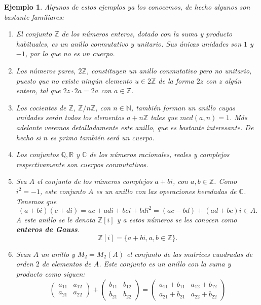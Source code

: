 \documentclass[12pt]{article}
\newtheorem{example}{Ejemplo}[theorem]
\begin{document}
\begin{example}\label{eq:ejemploAnillos} Algunos de estos ejemplos ya los conocemos, de hecho algunos son bastante familiares: \begin{enumerate}
\item El conjunto $\mathbb{Z}$ de los números enteros, dotado con la suma y producto habituales, es un anillo conmutativo y unitario. Sus únicas unidades son $1$ y $-1$, por lo que no es un cuerpo.
\item Los números pares, $2\mathbb{Z}$, constituyen un anillo conmutativo pero no unitario, puesto que no existe ningún elemento $u \in 2\mathbb{Z}$ de la forma $2z$ con $z$ algún entero, tal que $2z \cdot 2a = 2a$ con $a \in \mathbb{Z}$.
\item Los cocientes de $\mathbb{Z}$, $\mathbb{Z}/n\mathbb{Z}$, con $n \in \mathbb{N}$, también forman un anillo cuyas unidades serán todos los elementos $a+n\mathbb{Z}$ tales que $mcd(a,n)=1$. Más adelante veremos detalladamente este anillo, que es bastante interesante. De hecho si $n$ es primo también será un cuerpo.
\item Los conjuntos $\mathbb{Q}, \mathbb{R}$ y $\mathbb{C}$ de los números racionales, reales y complejos respectivamente son cuerpos conmutativos.
\item Sea $A$ el conjunto de los números complejos $a +bi$, con $a,b \in \mathbb{Z}$. Como $i^{2} = -1$, este conjunto $A$ es un anillo con las operaciones heredadas de $\mathbb{C}$. Tenemos que $$(a+bi)(c+di) = ac + adi + bci + bdi^{2} = (ac-bd) + (ad+bc)i \in A.$$ A este anillo se le denota $\mathbb{Z}[i]$ y a estos números se les conocen como \textbf{enteros de Gauss}.
$$\mathbb{Z}[i]=\lbrace a+bi, a,b \in \mathbb{Z} \rbrace.$$
\item Sean $A$ un anillo y $M_{2} = M_{2}(A)$ el conjunto de las matrices cuadradas de orden $2$ de elementos de $A$. Este conjunto es un anillo con la suma y producto como siguen:  $$\left(
\begin{matrix}
a_{11} & a_{12} \\
a_{21} & a_{22}
\end{matrix}
\right) + \left(
\begin{matrix}
b_{11} & b_{12} \\
b_{21} & b_{22}
\end{matrix}
\right) = \left(
\begin{matrix}
a_{11} + b_{11} & a_{12} + b_{12}\\
a_{21} +b_{21} & a_{22} + b_{22}
\end{matrix}
\right)$$ 


\end{enumerate}
\end{example}
\end{document}
